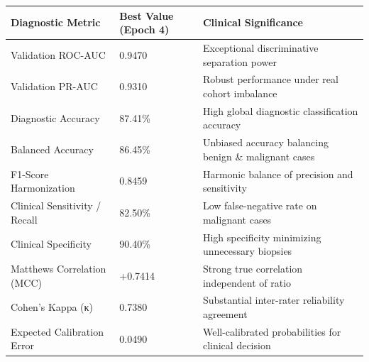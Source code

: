 \begin{tabular}{lll}
\toprule
Diagnostic Metric & Best Value (Epoch 4) & Clinical Significance \\
\midrule
Validation ROC-AUC & 0.9470 & Exceptional discriminative separation power \\
Validation PR-AUC & 0.9310 & Robust performance under real cohort imbalance \\
Diagnostic Accuracy & 87.41\% & High global diagnostic classification accuracy \\
Balanced Accuracy & 86.45\% & Unbiased accuracy balancing benign \& malignant cases \\
F1-Score Harmonization & 0.8459 & Harmonic balance of precision and sensitivity \\
Clinical Sensitivity / Recall & 82.50\% & Low false-negative rate on malignant cases \\
Clinical Specificity & 90.40\% & High specificity minimizing unnecessary biopsies \\
Matthews Correlation (MCC) & +0.7414 & Strong true correlation independent of ratio \\
Cohen's Kappa (κ) & 0.7380 & Substantial inter-rater reliability agreement \\
Expected Calibration Error & 0.0490 & Well-calibrated probabilities for clinical decision \\
\bottomrule
\end{tabular}
